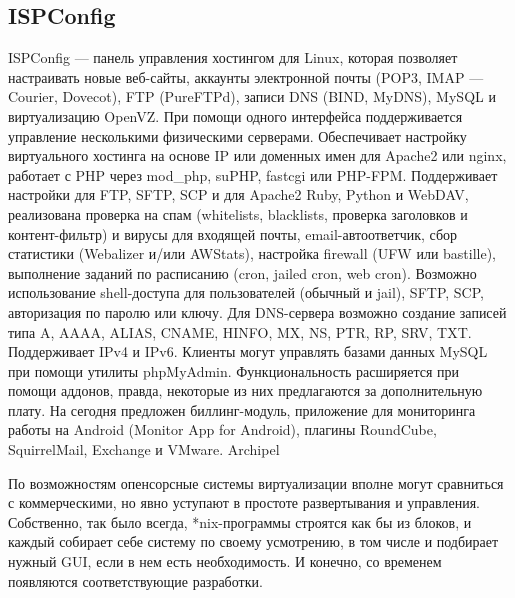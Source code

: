 \subsection{ISPConfig} 
ISPConfig — панель управления хостингом для Linux, которая позволяет настраивать новые веб-сайты, аккаунты электронной почты (POP3, IMAP — Courier, Dovecot), FTP (PureFTPd), записи DNS (BIND, MyDNS), MySQL и виртуализацию OpenVZ. При помощи одного интерфейса поддерживается управление несколькими физическими серверами. Обеспечивает настройку виртуального хостинга на основе IP или доменных имен для Apache2 или nginx, работает с PHP через mod\_php, suPHP, fastcgi или PHP-FPM. Поддерживает настройки для FTP, SFTP, SCP и для Apache2 Ruby, Python и WebDAV, реализована проверка на спам (whitelists, blacklists, проверка заголовков и контент-фильтр) и вирусы для входящей почты, email-автоответчик, сбор статистики (Webalizer и/или AWStats), настройка firewall (UFW или bastille), выполнение заданий по расписанию (cron, jailed cron, web cron). Возможно использование shell-доступа для пользователей (обычный и jail), SFTP, SCP, авторизация по паролю или ключу. Для DNS-сервера возможно создание записей типа A, AAAA, ALIAS, CNAME, HINFO, MX, NS, PTR, RP, SRV, TXT. Поддерживает IPv4 и IPv6.
Клиенты могут управлять базами данных MySQL при помощи утилиты phpMyAdmin.
Функциональность расширяется при помощи аддонов, правда, некоторые из них предлагаются за дополнительную плату. На сегодня предложен биллинг-модуль, приложение для мониторинга работы на Android (Monitor App for Android), плагины RoundCube, SquirrelMail, Exchange и VMware.
Archipel
 
По возможностям опенсорсные системы виртуализации вполне могут сравниться с коммерческими, но явно уступают в простоте развертывания и управления. Собственно, так было всегда, *nix-программы строятся как бы из блоков, и каждый собирает себе систему по своему усмотрению, в том числе и подбирает нужный GUI, если в нем есть необходимость. И конечно, со временем появляются соответствующие разработки.

